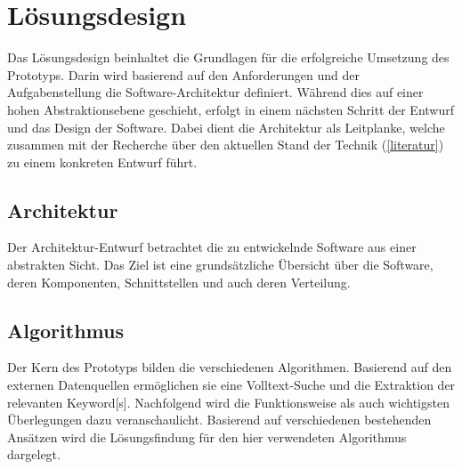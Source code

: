 \chapter{Lösungsdesign}

Das Lösungsdesign beinhaltet die Grundlagen für die erfolgreiche Umsetzung des Prototyps. Darin wird basierend auf den Anforderungen und der Aufgabenstellung die Software-Architektur definiert. Wäh\-rend dies auf einer hohen Abstraktionsebene geschieht, erfolgt in einem nächsten Schritt der Entwurf und das Design der Software. Dabei dient die Architektur als Leitplanke, welche zusammen mit der Recherche über den aktuellen Stand der Technik (\autoref{literatur}) zu einem konkreten Entwurf führt.


\section{Architektur}\label{architecture}


Der Architektur-Entwurf betrachtet die zu entwickelnde Software aus einer abstrakten Sicht. Das Ziel ist eine grundsätzliche Übersicht über die Software, deren Komponenten, Schnittstellen und auch deren Verteilung.







\section{Algorithmus}\label{algo}

Der Kern des Prototyps bilden die verschiedenen Algorithmen. Basierend auf den externen Datenquellen ermöglichen sie eine Volltext-Suche und die Extraktion der relevanten \gls{Keyword}[s]. Nachfolgend wird die Funktionsweise als auch wichtigsten Überlegungen dazu veranschaulicht. Basierend auf verschiedenen bestehenden Ansätzen wird die Lösungsfindung für den hier verwendeten Algorithmus dargelegt. 


